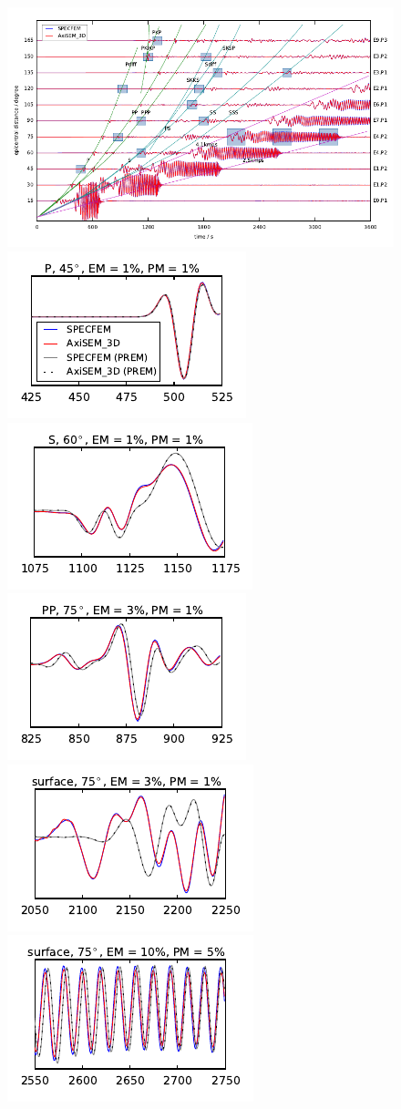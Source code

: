 \documentclass[extra]{gji}
\begin{document}
\begin{figure}
  \centering
  \includegraphics[width=\textwidth]{fig/section/VIR_s3_11_24.pdf}\vspace{-10pt}
  \includegraphics[width=.25\textwidth]{fig/section/1.pdf}\hspace{-5pt}
  \includegraphics[width=.25\textwidth]{fig/section/2.pdf}\hspace{-5pt}
  \includegraphics[width=.25\textwidth]{fig/section/3.pdf}\hspace{-5pt}
  \includegraphics[width=.25\textwidth]{fig/section/4.pdf}\vspace{-5pt}
  \includegraphics[width=.25\textwidth]{fig/section/5.pdf}\hspace{-5pt}

\end{figure}
\end{document}
